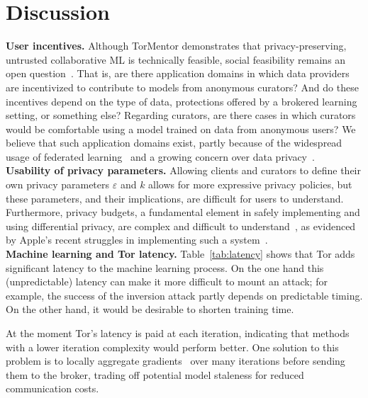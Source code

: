 \chapter{Discussion}
\label{sec:discuss}

\textbf{User incentives.}
%
Although TorMentor demonstrates that privacy-preserving, untrusted
collaborative ML is technically feasible, social feasibility remains an
open question~\cite{Stoica:2017}. That is, are there application
domains in which data providers are incentivized to contribute to
models from anonymous curators? And do these incentives depend on the
type of data, protections offered by a brokered learning setting, or
something else? Regarding curators, are there cases in which curators
would be comfortable using a model trained on data from anonymous
users? We believe that such application domains exist, partly because
of the widespread usage of federated learning~\cite{Frey:2017} and a
growing concern over data privacy~\cite{Fan:2015}.\\

\noindent \textbf{Usability of privacy parameters.}
%
Allowing clients and curators to define their own privacy parameters
$\varepsilon$ and $k$ allows for more expressive privacy policies, but
these parameters, and their implications, are difficult for users to
understand. Furthermore, privacy budgets, a fundamental element in
safely implementing and using differential privacy, are complex
and difficult to understand~\cite{Fan:2015}, as evidenced by Apple's
recent struggles in implementing such a system~\cite{Apple:2017}. \\

\noindent \textbf{Machine learning and Tor latency.}
%
Table~\ref{tab:latency} shows that Tor adds significant latency to the
machine learning process. On the one hand this (unpredictable) latency
can make it more difficult to mount an attack; for example, the
success of the inversion attack partly depends on predictable timing.
On the other hand, it would be desirable to shorten training time. 

At the moment Tor's latency is paid at each iteration, indicating that
methods with a lower iteration complexity would perform better. One
solution to this problem is to locally aggregate
gradients~\cite{Hsieh:2017, McMahan:2017, Bonawitz:2017} over many
iterations before sending them to the broker, trading off potential
model staleness for reduced communication costs. 

